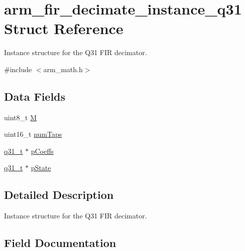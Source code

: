\hypertarget{structarm__fir__decimate__instance__q31}{}\section{arm\+\_\+fir\+\_\+decimate\+\_\+instance\+\_\+q31 Struct Reference}
\label{structarm__fir__decimate__instance__q31}


Instance structure for the Q31 F\+IR decimator.  




{\ttfamily \#include $<$arm\+\_\+math.\+h$>$}

\subsection*{Data Fields}
\begin{DoxyCompactItemize}
\item 
uint8\+\_\+t \mbox{\hyperlink{structarm__fir__decimate__instance__q31_ae2c8107d00d3c9942e7a20fc598edecf}{M}}
\item 
uint16\+\_\+t \mbox{\hyperlink{structarm__fir__decimate__instance__q31_a751941891e47f522a7f5375fe8990aac}{num\+Taps}}
\item 
\mbox{\hyperlink{arm__math_8h_adc89a3547f5324b7b3b95adec3806bc0}{q31\+\_\+t}} $\ast$ \mbox{\hyperlink{structarm__fir__decimate__instance__q31_a68888e36167d81cb7836db10367a1682}{p\+Coeffs}}
\item 
\mbox{\hyperlink{arm__math_8h_adc89a3547f5324b7b3b95adec3806bc0}{q31\+\_\+t}} $\ast$ \mbox{\hyperlink{structarm__fir__decimate__instance__q31_adee4ba3ee8869865af7d8fa08ca913d6}{p\+State}}
\end{DoxyCompactItemize}


\subsection{Detailed Description}
Instance structure for the Q31 F\+IR decimator. 

\subsection{Field Documentation}
\mbox{\label{structarm__fir__decimate__instance__q31_ae2c8107d00d3c9942e7a20fc598edecf}} 
